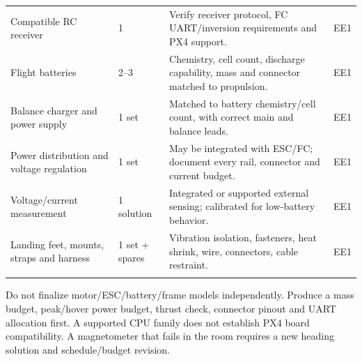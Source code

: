 \documentclass[10pt,letterpaper]{article}
\begin{document}
\begin{longtable}{P{1.562in}P{0.781in}P{3.383in}P{0.781in}}
Compatible RC receiver & 1 & Verify receiver protocol, FC UART/inversion requirements and PX4 support. & EE1 \\ \addlinespace[2pt]
Flight batteries & 2--3 & Chemistry, cell count, discharge capability, mass and connector matched to propulsion. & EE1 \\ \addlinespace[2pt]
Balance charger and power supply & 1 set & Matched to battery chemistry/cell count, with correct main and balance leads. & EE1 \\ \addlinespace[2pt]
Power distribution and voltage regulation & 1 set & May be integrated with ESC/FC; document every rail, connector and current budget. & EE1 \\ \addlinespace[2pt]
Voltage/current measurement & 1 solution & Integrated or supported external sensing; calibrated for low-battery behavior. & EE1 \\ \addlinespace[2pt]
Landing feet, mounts, straps and harness & 1 set + spares & Vibration isolation, fasteners, heat shrink, wire, connectors, cable restraint. & EE1 \\ \addlinespace[2pt]
\end{longtable}\endgroup
Do not finalize motor/ESC/battery/frame models independently. Produce a mass budget, peak/hover power budget, thrust check, connector pinout and UART allocation first. A supported CPU family does not establish PX4 board compatibility. A magnetometer that fails in the room requires a new heading solution and schedule/budget revision.
\end{document}
